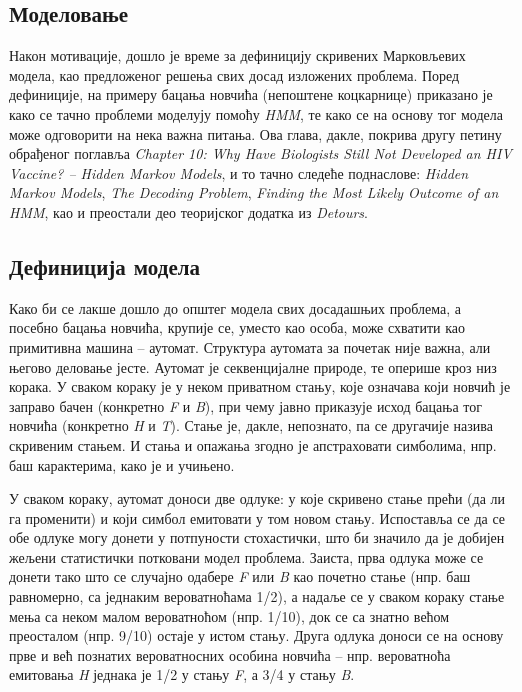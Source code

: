 \documentclass[12pt,oneside]{memoir}
\begin{document}
\begin{CJK}{UTF8}{ipxm}
\chapter{Моделовање}
Након мотивације, дошло је време за дефиницију скривених Марковљевих модела, као предложеног решења свих досад изложених проблема. Поред дефиниције, на примеру бацања новчића (непоштене коцкарнице) приказано је како се тачно проблеми моделују помоћу \textit{HMM}, те како се на основу тог модела може одговорити на нека важна питања. Ова глава, дакле, покрива другу петину обрађеног поглавља \textit{Chapter 10: Why Have Biologists Still Not Developed an HIV Vaccine? -- Hidden Markov Models}, и то тачно следеће поднаслове: \textit{Hidden Markov Models}, \textit{The Decoding Problem}, \textit{Finding the Most Likely Outcome of an HMM}, као и преостали део теоријског додатка из \textit{Detours}.

\section{Дефиниција модела}
Како би се лакше дошло до општег модела свих досадашњих проблема, а посебно бацања новчића, крупије се, уместо као особа, може схватити као примитивна машина -- аутомат. Структура аутомата за почетак није важна, али његово деловање јесте. Аутомат је секвенцијалне природе, те оперише кроз низ корака. У сваком кораку је у неком приватном стању, које означава који новчић је заправо бачен (конкретно \textit{F} и \textit{B}), при чему јавно приказује исход бацања тог новчића (конкретно \textit{H} и \textit{T}). Стање је, дакле, непознато, па се другачије назива скривеним стањем. И стања и опажања згодно је апстраховати симболима, нпр. баш карактерима, како је и учињено.

У сваком кораку, аутомат доноси две одлуке: у које скривено стање прећи (да ли га променити) и који симбол емитовати у том новом стању. Испоставља се да се обе одлуке могу донети у потпуности стохастички, што би значило да је добијен жељени статистички потковани модел проблема. Заиста, прва одлука може се донети тако што се случајно одабере \textit{F} или \textit{B} као почетно стање (нпр. баш равномерно, са једнаким вероватноћама 1/2), а надаље се у сваком кораку стање мења са неком малом вероватноћом (нпр. 1/10), док се са знатно већом преосталом (нпр. 9/10) остаје у истом стању. Друга одлука доноси се на основу прве и већ познатих вероватносних особина новчића -- нпр. вероватноћа емитовања \textit{H} једнака је 1/2 у стању \textit{F}, а 3/4 у стању \textit{B}.


\end{CJK}
\end{document}
